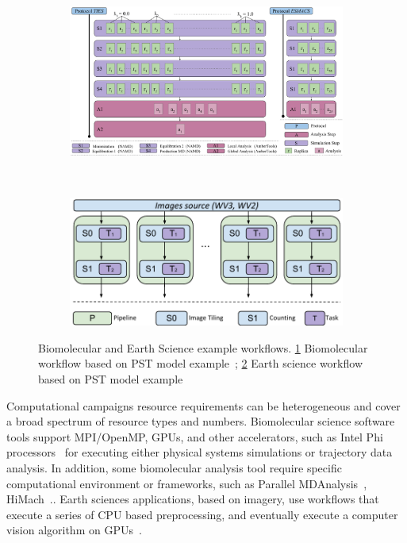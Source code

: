 \begin{figure}[ht!]
    \centering
    \begin{subfigure}[b]{0.45\textwidth}
         \includegraphics[width=\linewidth]{figures/bio_workflow.pdf}
        \caption{}
        \label{fig:bio_workflow}
    \end{subfigure}%
    ~ 
    \begin{subfigure}[b]{0.45\textwidth}
        \includegraphics[width=\linewidth]{figures/earth_workflow.pdf}
        \caption{}
        \label{fig:earth_workflow}
    \end{subfigure}
    \caption{Biomolecular and Earth Science example workflows. \ref{fig:bio_workflow} Biomolecular workflow based on PST model example~\cite{dakka2018concurrent}; \ref{fig:earth_workflow} Earth science workflow based on PST model example~\cite{paraskevakos2019workflow}}\label{fig:bio_earth_workflows}
\end{figure}

Computational campaigns resource requirements can be heterogeneous and cover a broad spectrum of resource types and numbers.
Biomolecular science software tools support MPI/OpenMP, GPUs, and other accelerators, such as Intel Phi processors~\cite{cheatham2015impact} for executing either physical systems simulations or trajectory data analysis. 
In addition, some biomolecular analysis tool require specific computational environment or frameworks, such as Parallel MDAnalysis~\cite{fan2019pmda}, HiMach~\cite{tiankai2008scalable}..
Earth sciences applications, based on imagery, use workflows that execute a series of CPU based preprocessing, and eventually execute a computer vision algorithm on GPUs~\cite{paraskevakos2019workflow}.

